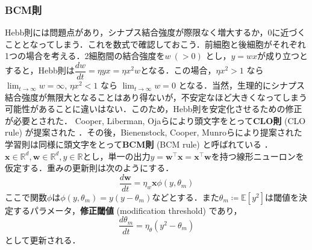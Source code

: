 \subsubsection{BCM則}
Hebb則には問題点があり，シナプス結合強度が際限なく増大するか，0に近づくこととなってしまう．これを数式で確認しておこう．前細胞と後細胞がそれぞれ1つの場合を考える．2細胞間の結合強度を$w\ (>0)$ とし，$y=wx$が成り立つとすると，Hebb則は$\dfrac{dw}{dt}=\eta yx=\eta x^2w$となる．この場合，$\eta x^2>1$ なら $\lim_{t\to\infty} w= \infty$, $\eta x^2<1$ なら $\lim_{t\to\infty} w= 0$ となる．当然，生理的にシナプス結合強度が無限大となることはあり得ないが，不安定なほど大きくなってしまう可能性があることに違いはない．このため，Hebb則を安定化させるための修正が必要とされた．
Cooper, Liberman, Ojaらにより頭文字をとって\textbf{CLO則} (CLO rule) が提案された \citep{Cooper1979-wz}．その後，Bienenstock, Cooper, Munroらにより提案された学習則は同様に頭文字をとって\textbf{BCM則} (BCM rule) と呼ばれている\citep{Bienenstock1982-km} \citep{Cooper2012-ec}．
$\mathbf{x}\in \mathbb{R}^d, \mathbf{w}\in \mathbb{R}^d, y\in \mathbb{R}$とし，単一の出力$y = \mathbf{w}^\top \mathbf{x}=\mathbf{x}^\top \mathbf{w}$を持つ線形ニューロンを仮定する．重みの更新則は次のようにする．
\begin{equation}
\frac{d\mathbf{w}}{dt} = \eta_w \mathbf{x} \phi(y, \theta_m)
\end{equation}
ここで関数$\phi$は$\phi(y, \theta_m)=y(y-\theta_m)$などとする．また$\theta_m\coloneqq \mathbb{E}[y^2]$は閾値を決定するパラメータ，\textbf{修正閾値} (modification threshold) であり，
\begin{equation}
\frac{d\theta_m}{dt} = \eta_{\theta} \left(y^2-\theta_m\right)
\end{equation}
として更新される．
